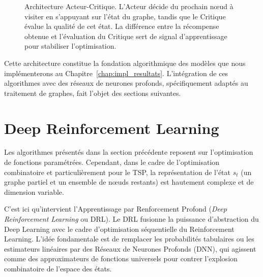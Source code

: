 \documentclass[12pt, a4paper, twoside, openright]{book}
\begin{document}
\begin{figure}[H]
		\caption{Architecture Acteur-Critique. L'Acteur décide du prochain n\oe{}ud à visiter en s'appuyant sur l'état du graphe, tandis que le Critique évalue la qualité de cet état. La différence entre la récompense obtenue et l'évaluation du Critique sert de signal d'apprentissage pour stabiliser l'optimisation.}
		\label{fig:actor_critic}
	\end{figure}
	
	Cette architecture constitue la fondation algorithmique des modèles que nous implémenterons au Chapitre~\ref{chap:impl_resultats}. L'intégration de ces algorithmes avec des réseaux de neurones profonds, spécifiquement adaptés au traitement de graphes, fait l'objet des sections suivantes.
	
	\section{Deep Reinforcement Learning}
	\label{sec:drl}
	
	Les algorithmes présentés dans la section précédente reposent sur l'optimisation de fonctions paramétrées. Cependant, dans le cadre de l'optimisation combinatoire et particulièrement pour le TSP, la représentation de l'état $s_t$ (un graphe partiel et un ensemble de n\oe{}uds restants) est hautement complexe et de dimension variable.
	
	C'est ici qu'intervient l'Apprentissage par Renforcement Profond (\textit{Deep Reinforcement Learning} ou DRL). Le DRL fusionne la puissance d'abstraction du Deep Learning avec le cadre d'optimisation séquentielle du Reinforcement Learning. L'idée fondamentale est de remplacer les probabilités tabulaires ou les estimateurs linéaires par des Réseaux de Neurones Profonds (DNN), qui agissent comme des approximateurs de fonctions universels pour contrer l'explosion combinatoire de l'espace des états.
	
\end{document}
